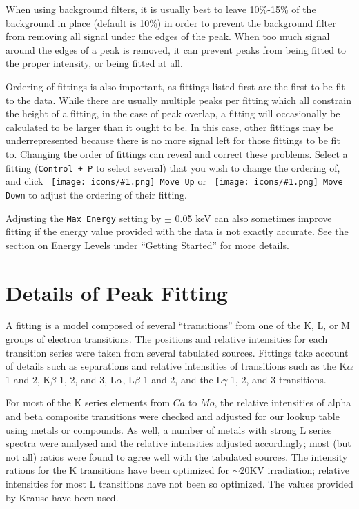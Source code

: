 \documentclass[article,twoside,11pt]{report}
\newcommand{\command}[1]{\texttt{#1}}
\newcommand{\icon}[1]{\texttt{[image: icons/\#1.png]}}
\newcommand{\button}[2]{\ \command{\icon{#1} #2}}
\newcommand{\shortcut}[2]{\command{#1 + #2}}
\newcommand{\element}[1]{$#1$}
\newcommand{\tocsection}[1]{\section*{#1}\addcontentsline{toc}{section}{#1}}
\begin{document}
When using background filters, it is usually best to leave 10\%-15\% of the background in place
(default is 10\%) in order to prevent the background filter from removing all signal under the
edges of the peak. When too much signal around the edges of a peak is removed, it can prevent
peaks from being fitted to the proper intensity, or being fitted at all.

Ordering of fittings is also important, as fittings listed first are the first 
to be fit to the data. While there are usually multiple peaks per fitting which all constrain 
the height of a fitting, in the case of peak overlap, a fitting will occasionally 
be calculated to be larger than it ought to be. In this case, other fittings may be 
underrepresented because there is no more signal left for those fittings to be fit to.
Changing the order of fittings can reveal and correct these problems. Select a fitting 
(\shortcut{Control}{P} to select several) that you wish to change the ordering of, and
click \button{go-up}{Move Up} or \button{go-down}{Move Down} to adjust the ordering
of their fitting.

Adjusting the \command{Max Energy} setting by $\pm$ 0.05 keV can also sometimes improve fitting
if the energy value provided with the data is not exactly accurate. See the section on Energy 
Levels under ``Getting Started'' for more details.

\tocsection{Details of Peak Fitting}

A fitting is a model composed of several ``transitions'' from one of the K, L, or M groups of 
electron transitions. The positions and relative intensities for each transition series
were taken from several tabulated sources. Fittings take account of details such as 
separations and relative intensities of transitions such as the K$\alpha$ 1 and 2,  
K$\beta$ 1, 2, and 3, L$\alpha$, L$\beta$ 1 and 2, and the L$\gamma$ 1, 2, and 3 transitions.

For most of the K series elements from \element{Ca} to \element{Mo}, the relative 
intensities of alpha and beta composite transitions were checked and adjusted for our 
lookup table using metals or compounds. As well, a number of metals with strong L 
series spectra were analysed and the relative intensities adjusted accordingly; 
most (but not all) ratios were found to agree well with the tabulated sources. The 
intensity rations for the K transitions have been optimized for $\sim$20KV irradiation; relative 
intensities for most L transitions have not been so optimized. The values provided by Krause 
\cite{kraus} have been used. 
\end{document}
